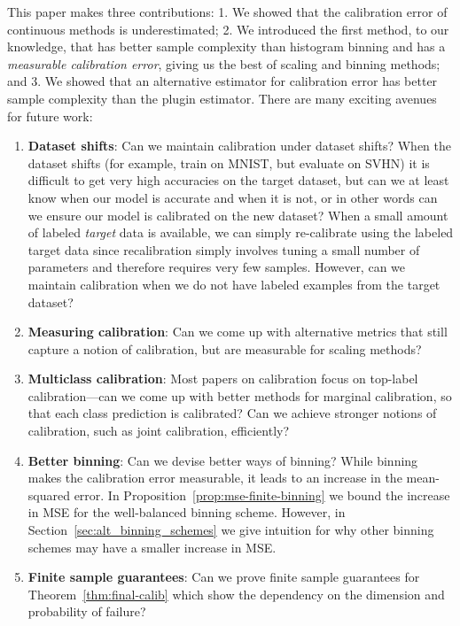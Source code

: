 This paper makes three contributions: 1. We showed that the calibration error of continuous methods is underestimated; 2. We introduced the first method, to our knowledge, that has better sample complexity than histogram binning and has a \emph{measurable calibration error}, giving us the best of scaling and binning methods; and 3. We showed that an alternative estimator for calibration error has better sample complexity than the plugin estimator.
There are many exciting avenues for future work:
\begin{enumerate}
\item \textbf{Dataset shifts}: Can we maintain calibration under dataset shifts? When the dataset shifts (for example, train on MNIST, but evaluate on SVHN) it is difficult to get very high accuracies on the target dataset, but can we at least know when our model is accurate and when it is not, or in other words can we ensure our model is calibrated on the new dataset? When a small amount of labeled \emph{target} data is available, we can simply re-calibrate using the labeled target data since recalibration simply involves tuning a small number of parameters and therefore requires very few samples. However, can we maintain calibration when we do not have labeled examples from the target dataset? 
\item \textbf{Measuring calibration}: Can we come up with alternative metrics that still capture a notion of calibration, but are measurable for scaling methods?
\item \textbf{Multiclass calibration}: Most papers on calibration focus on top-label calibration---can we come up with better methods for marginal calibration, so that each class prediction is calibrated? Can we achieve stronger notions of calibration, such as joint calibration, efficiently? 
\item \textbf{Better binning}: Can we devise better ways of binning? While binning makes the calibration error measurable, it leads to an increase in the mean-squared error. In Proposition~\ref{prop:mse-finite-binning} we bound the increase in MSE for the well-balanced binning scheme. However, in Section~\ref{sec:alt_binning_schemes} we give intuition for why other binning schemes may have a smaller increase in MSE.
\item \textbf{Finite sample guarantees}: Can we prove finite sample guarantees for Theorem~\ref{thm:final-calib} which show the dependency on the dimension and probability of failure?

\end{enumerate}
